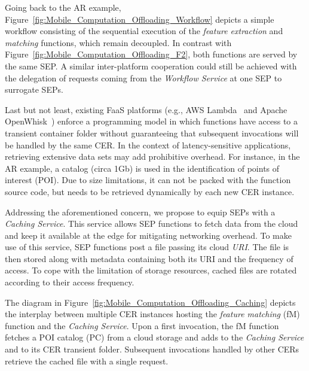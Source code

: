 Going back to the AR example, Figure~\ref{fig:Mobile_Computation_Offloading_Workflow} depicts a simple workflow consisting of the sequential execution of the \textit{feature extraction} and \textit{matching} functions, which remain decoupled. In contrast with Figure~\ref{fig:Mobile_Computation_Offloading_F2}, both functions are served by the same SEP. A similar inter-platform cooperation could still be achieved with the delegation of requests coming from the \textit{Workflow Service} at one SEP to surrogate SEPs.

Last but not least, existing FaaS platforms (e.g., AWS Lambda~\cite{AWSLambda} and Apache OpenWhisk~\cite{OpenWhisk}) enforce a programming model in which functions have access to a transient container folder without guaranteeing that subsequent invocations will be handled by the same CER. %
In the context of latency-sensitive applications, retrieving extensive data sets may add prohibitive overhead. For instance, in the AR example, a catalog (circa 1Gb) is used in the identification of points of interest (POI).
Due to size limitations, it can not be packed with the function source code, but needs to be retrieved dynamically by each new CER instance.

Addressing the aforementioned concern, we propose to equip SEPs with a \textit{Caching Service}. This service allows SEP functions to fetch data from the cloud and keep it available at the edge for mitigating networking overhead. 
To make use of this service, SEP functions post a file passing its cloud \textit{URI}.
The file is then stored along with metadata containing both its URI and the frequency of access. %
To cope with the limitation of storage resources, cached files are rotated according to their access frequency. %

The diagram in Figure~\ref{fig:Mobile_Computation_Offloading_Caching} depicts the interplay between multiple CER instances hosting the \textit{feature matching} (fM) function and the \textit{Caching Service}. Upon a first invocation, the fM function fetches a POI catalog (PC) from a cloud storage and adds to the \textit{Caching Service} and to its CER transient folder. Subsequent invocations handled by other CERs retrieve the cached file with a single request.

